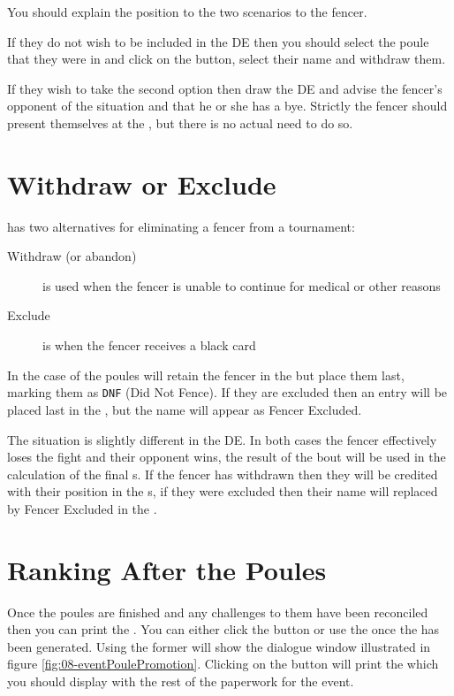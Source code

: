 \documentclass[a4paper,11pt]{memoir}
\begin{document}
You should explain the position to the two scenarios to the fencer.

If they do not wish to be included in the DE then you should select the poule that they were in and click on the  button, select their name and withdraw them.

If they wish to take the second option then draw the DE and advise the fencer's opponent of the situation and that he or she has a bye. Strictly the fencer should present themselves at the , but there is no actual need to do so.

\section{Withdraw or Exclude}

\fencingtime{} has two alternatives for eliminating a fencer from a tournament:
\begin{description}
 \item[Withdraw (or abandon)] is used when the fencer is unable to continue for medical or other reasons
 \item[Exclude] is when the fencer receives a \gls{black card}
\end{description}

In the case of the poules \fencingtime{} will retain the fencer in the  but place them last, marking them as \texttt{DNF} (Did Not Fence). If they are excluded then an entry will be placed last in the , but the name will appear as Fencer Excluded.

The situation is slightly different in the DE. In both cases the fencer effectively loses the fight and their opponent wins, the result of the bout will be used in the calculation of the final s. If the fencer has withdrawn then they will be credited with their position in the s, if they were excluded then their name will replaced by Fencer Excluded in the .

\section{Ranking After the Poules}

Once the poules are finished and any challenges to them have been reconciled then you can print the . You can either click the  button or use the  once the  has been generated. Using the former will show the dialogue window illustrated in figure \ref{fig:08-eventPoulePromotion}. Clicking on the  button will print the  which you should display with the rest of the paperwork for the event.
\end{document}
